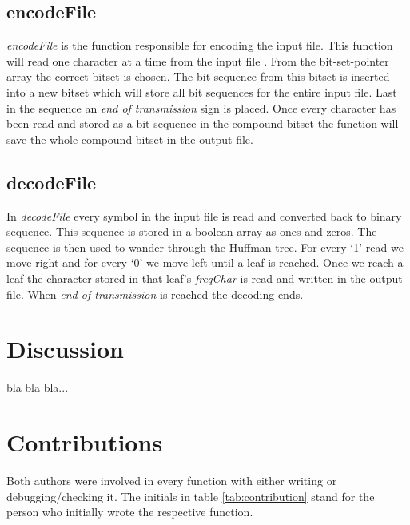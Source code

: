 \documentclass[a4paper,11pt,twoside]{article}
\begin{document}
\subsection{encodeFile}
\emph{encodeFile} is the function responsible for encoding the input file. This function will read one character at a time from the input file . From the bit-set-pointer array the correct bitset is chosen. The bit sequence from this bitset is inserted into a new bitset which will store all bit sequences for the entire input file. Last in the sequence an \emph{end of transmission} sign is placed. Once every character has been read and stored as a bit sequence in the compound bitset the function will save the whole compound bitset in the output file.

\subsection{decodeFile}
In \emph{decodeFile} every symbol in the input file is read and converted back to binary sequence. This sequence is stored in a boolean-array as ones and zeros. The sequence is then used to wander through the Huffman tree. For every `1' read we move right and for every `0' we move left until a leaf is reached. Once we reach a leaf the character stored in that leaf's \emph{freqChar} is read and written in the output file. When \emph{end of transmission} is reached the decoding ends.

\section{Discussion}
bla bla bla...

\section{Contributions}
Both authors were involved in every function with either writing or
debugging/checking it. The initials in table \ref{tab:contribution}
stand for the person who initially wrote the respective function.
\end{document}
